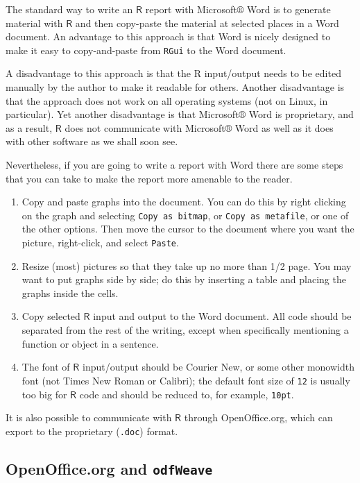 \documentclass[captions=tableheading]{scrbook}
\begin{document}
\begin{example}
The standard way to write an \(\mathsf{R}\) report with Microsoft\(\circledR\) Word is to generate material with \(\mathsf{R}\) and then copy-paste the material at selected places in a Word document. An advantage to this approach is that Word is nicely designed to make it easy to copy-and-paste from \texttt{RGui} to the Word document.

A disadvantage to this approach is that the R input/output needs to be edited manually by the author to make it readable for others. Another disadvantage is that the approach does not work on all operating systems (not on Linux, in particular). Yet another disadvantage is that Microsoft\(\circledR\) Word is proprietary, and as a result, \(\mathsf{R}\) does not communicate with Microsoft\(\circledR\) Word as well as it does with other software as we shall soon see.

Nevertheless, if you are going to write a report with Word there are some steps that you can take to make the report more amenable to the reader. 

\begin{enumerate}
\item Copy and paste graphs into the document. You can do this by right clicking on the graph and selecting \texttt{Copy as bitmap}, or \texttt{Copy as metafile}, or one of the other options. Then move the cursor to the document where you want the picture, right-click, and select \texttt{Paste}.
\item Resize (most) pictures so that they take up no more than 1/2 page. You may want to put graphs side by side; do this by inserting a table and placing the graphs inside the cells.
\item Copy selected \(\mathsf{R}\) input and output to the Word document. All code should be separated from the rest of the writing, except when specifically mentioning a function or object in a sentence.
\item The font of \(\mathsf{R}\) input/output should be Courier New, or some other monowidth font (not Times New Roman or Calibri); the default font size of \texttt{12} is usually too big for \(\mathsf{R}\) code and should be reduced to, for example, \texttt{10pt}.
\end{enumerate}

It is also possible to communicate with \(\mathsf{R}\) through OpenOffice.org, which can export to the proprietary (\texttt{.doc}) format.
\subsection{OpenOffice.org and \texttt{odfWeave}}
\label{sec-22-2-2}


\end{example}
\end{document}
